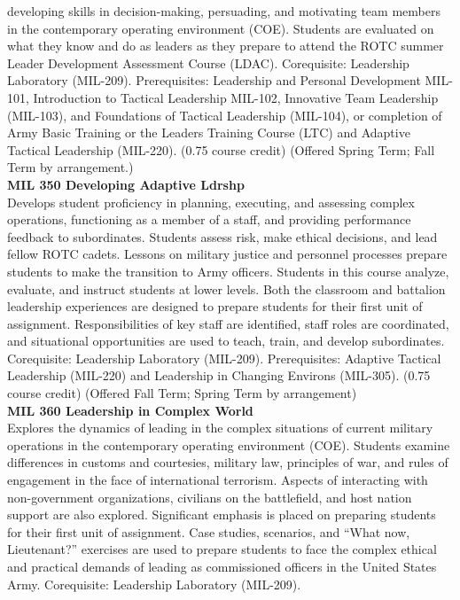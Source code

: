 \documentclass[
  letterpaper,
]{scrbook}
\begin{document}
developing skills in decision-making, persuading, and motivating team
members in the contemporary operating environment (COE). Students are
evaluated on what they know and do as leaders as they prepare to attend
the ROTC summer Leader Development Assessment Course (LDAC).
Corequisite: Leadership Laboratory (MIL-209). Prerequisites: Leadership
and Personal Development MIL-101, Introduction to Tactical Leadership
MIL-102, Innovative Team Leadership (MIL-103), and Foundations of
Tactical Leadership (MIL-104), or completion of Army Basic Training or
the Leaders Training Course (LTC) and Adaptive Tactical Leadership
(MIL-220). (0.75 course credit) (Offered Spring Term; Fall Term by
arrangement.)\\
\textbf{MIL 350 Developing Adaptive Ldrshp}\\
Develops student proficiency in planning, executing, and assessing
complex operations, functioning as a member of a staff, and providing
performance feedback to subordinates. Students assess risk, make ethical
decisions, and lead fellow ROTC cadets. Lessons on military justice and
personnel processes prepare students to make the transition to Army
officers. Students in this course analyze, evaluate, and instruct
students at lower levels. Both the classroom and battalion leadership
experiences are designed to prepare students for their first unit of
assignment. Responsibilities of key staff are identified, staff roles
are coordinated, and situational opportunities are used to teach, train,
and develop subordinates. Corequisite: Leadership Laboratory (MIL-209).
Prerequisites: Adaptive Tactical Leadership (MIL-220) and Leadership in
Changing Environs (MIL-305). (0.75 course credit) (Offered Fall Term;
Spring Term by arrangement)\\
\textbf{MIL 360 Leadership in Complex World}\\
Explores the dynamics of leading in the complex situations of current
military operations in the contemporary operating environment (COE).
Students examine differences in customs and courtesies, military law,
principles of war, and rules of engagement in the face of international
terrorism. Aspects of interacting with non-government organizations,
civilians on the battlefield, and host nation support are also explored.
Significant emphasis is placed on preparing students for their first
unit of assignment. Case studies, scenarios, and ``What now,
Lieutenant?'' exercises are used to prepare students to face the complex
ethical and practical demands of leading as commissioned officers in the
United States Army. Corequisite: Leadership Laboratory (MIL-209).
\end{document}
